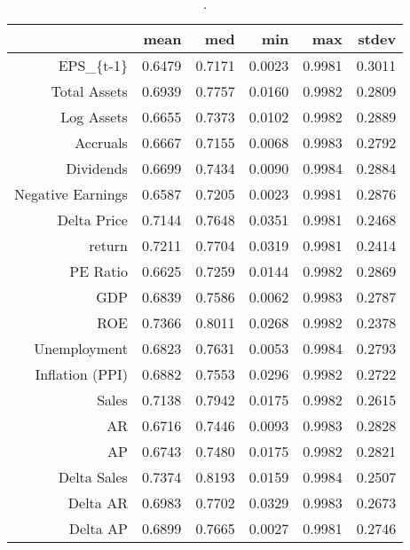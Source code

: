 \begin{table}[ht]
\centering
\begin{tabular}{rrrrrr}
  \hline
 & mean & med & min & max & stdev \\ 
  \hline
EPS\_\{t-1\} & 0.6479 & 0.7171 & 0.0023 & 0.9981 & 0.3011 \\ 
  Total Assets & 0.6939 & 0.7757 & 0.0160 & 0.9982 & 0.2809 \\ 
  Log Assets & 0.6655 & 0.7373 & 0.0102 & 0.9982 & 0.2889 \\ 
  Accruals & 0.6667 & 0.7155 & 0.0068 & 0.9983 & 0.2792 \\ 
  Dividends & 0.6699 & 0.7434 & 0.0090 & 0.9984 & 0.2884 \\ 
  Negative Earnings & 0.6587 & 0.7205 & 0.0023 & 0.9981 & 0.2876 \\ 
  Delta Price & 0.7144 & 0.7648 & 0.0351 & 0.9981 & 0.2468 \\ 
  return & 0.7211 & 0.7704 & 0.0319 & 0.9981 & 0.2414 \\ 
  PE Ratio & 0.6625 & 0.7259 & 0.0144 & 0.9982 & 0.2869 \\ 
  GDP & 0.6839 & 0.7586 & 0.0062 & 0.9983 & 0.2787 \\ 
  ROE & 0.7366 & 0.8011 & 0.0268 & 0.9982 & 0.2378 \\ 
  Unemployment & 0.6823 & 0.7631 & 0.0053 & 0.9984 & 0.2793 \\ 
  Inflation (PPI) & 0.6882 & 0.7553 & 0.0296 & 0.9982 & 0.2722 \\ 
  Sales & 0.7138 & 0.7942 & 0.0175 & 0.9982 & 0.2615 \\ 
  AR & 0.6716 & 0.7446 & 0.0093 & 0.9983 & 0.2828 \\ 
  AP & 0.6743 & 0.7480 & 0.0175 & 0.9982 & 0.2821 \\ 
  Delta Sales & 0.7374 & 0.8193 & 0.0159 & 0.9984 & 0.2507 \\ 
  Delta AR & 0.6983 & 0.7702 & 0.0329 & 0.9983 & 0.2673 \\ 
  Delta AP & 0.6899 & 0.7665 & 0.0027 & 0.9981 & 0.2746 \\ 
   \hline
\end{tabular}
\caption{.} 
\label{univariate-stats-eps-rsquared}
\end{table}
